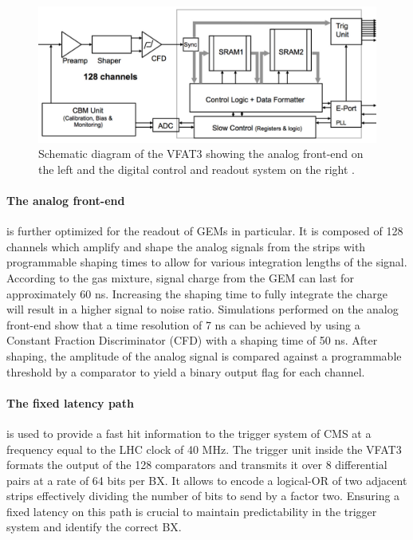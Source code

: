       \begin{figure}[b!]
        \centering
        \includegraphics[width=\textwidth]{img/II-2-daq/vfat3.pdf}
        \caption{Schematic diagram of the VFAT3 showing the analog front-end on the left and the digital control and readout system on the right \cite{Colaleo:2021453}.}
        \label{fig:II-2-vfat3}
      \end{figure}

      \paragraph{The analog front-end} is further optimized for the readout of GEMs in particular. It is composed of 128 channels which amplify and shape the analog signals from the strips with programmable shaping times to allow for various integration lengths of the signal. According to the gas mixture, signal charge from the GEM can last for approximately 60 ns. Increasing the shaping time to fully integrate the charge will result in a higher signal to noise ratio. Simulations \cite{Thierry:2065693} performed on the analog front-end show that a time resolution of 7 ns can be achieved by using a Constant Fraction Discriminator (CFD) with a shaping time of 50 ns. After shaping, the amplitude of the analog signal is compared against a programmable threshold by a comparator to yield a binary output flag for each channel. \\

      \paragraph{The fixed latency path} is used to provide a fast hit information to the trigger system of CMS at a frequency equal to the LHC clock of 40 MHz. The trigger unit inside the VFAT3 formats the output of the 128 comparators and transmits it over 8 differential pairs at a rate of 64 bits per BX. It allows to encode a logical-OR of two adjacent strips effectively dividing the number of bits to send by a factor two. Ensuring a fixed latency on this path is crucial to maintain predictability in the trigger system and identify the correct BX. \\

